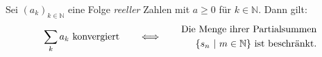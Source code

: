 Sei $(a_k)_{k \in \mathbb{N}}$ eine Folge \textit{reeller} Zahlen mit $a \geq 0$ für $k \in \mathbb{N}$. Dann gilt:
$$
    \sum_k a_k \\ \text{ konvergiert} \qquad \Longleftrightarrow \qquad 
    \begin{aligned} 
        \text{Die Menge ihrer Partialsummen} \\ \{s_n \ | \ m \in \mathbb{N}\} \text{ ist beschränkt.}
    \end{aligned}
$$